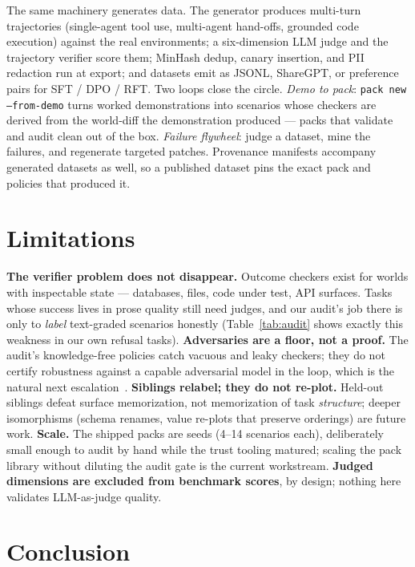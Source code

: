 \documentclass[11pt]{article}
\begin{document}
The same machinery generates data. The generator produces multi-turn
trajectories (single-agent tool use, multi-agent hand-offs, grounded code
execution) against the real environments; a six-dimension LLM judge and the
trajectory verifier score them; MinHash dedup, canary insertion, and PII
redaction run at export; and datasets emit as JSONL, ShareGPT, or preference
pairs for SFT / DPO / RFT. Two loops close the circle. \emph{Demo to pack}:
\texttt{pack new --from-demo} turns worked demonstrations into scenarios whose
checkers are derived from the world-diff the demonstration produced --- packs
that validate and audit clean out of the box. \emph{Failure flywheel}: judge a
dataset, mine the failures, and regenerate targeted patches. Provenance
manifests accompany generated datasets as well, so a published dataset pins
the exact pack and policies that produced it.

\section{Limitations}\label{sec:limits}

\textbf{The verifier problem does not disappear.} Outcome checkers exist for
worlds with inspectable state --- databases, files, code under test, API
surfaces. Tasks whose success lives in prose quality still need judges, and
our audit's job there is only to \emph{label} text-graded scenarios honestly
(Table~\ref{tab:audit} shows exactly this weakness in our own refusal tasks).
\textbf{Adversaries are a floor, not a proof.} The audit's knowledge-free
policies catch vacuous and leaky checkers; they do not certify robustness
against a capable adversarial model in the loop, which is the natural next
escalation~\cite{hackerfixer,gamingverifiers}. \textbf{Siblings relabel; they
do not re-plot.} Held-out siblings defeat surface memorization, not
memorization of task \emph{structure}; deeper isomorphisms (schema renames,
value re-plots that preserve orderings) are future work.
\textbf{Scale.} The shipped packs are seeds (4--14 scenarios each),
deliberately small enough to audit by hand while the trust tooling matured;
scaling the pack library without diluting the audit gate is the current
workstream. \textbf{Judged dimensions are excluded from benchmark scores}, by
design; nothing here validates LLM-as-judge quality.

\section{Conclusion}
\end{document}

